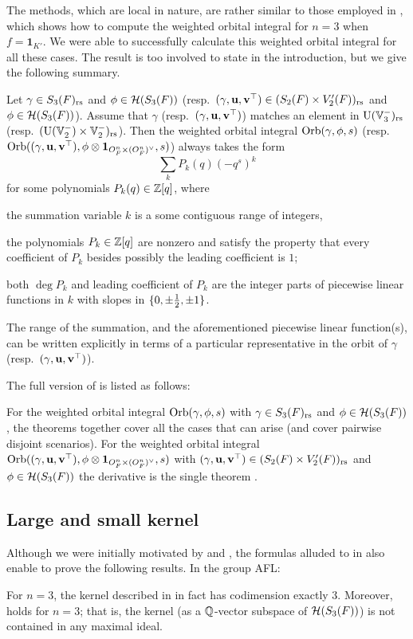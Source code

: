 The methods, which are local in nature,
are rather similar to those employed in \cite{ref:AFL},
which shows how to compute the weighted orbital integral for $n = 3$ when $f = \mathbf{1}_{K'}$.
We were able to successfully calculate this weighted orbital integral for all these cases.
The result is too involved to state in the introduction,
but we give the following summary.
\begin{theorem}
  \label{thm:summary}
  Let $\gamma \in S_3(F)_{\mathrm{rs}}$ and $\phi \in \mathcal H(S_3(F))$
  (resp.\ ${(\gamma, \mathbf u, \mathbf v^\top)} \in (S_2(F) \times V'_2(F))_{\mathrm{rs}}$ and $\phi \in \mathcal H(S_3(F))$).
  Assume that $\gamma$ (resp.\ ${(\gamma, \mathbf u, \mathbf v^\top)}$)
  matches an element in $\operatorname{U}(\mathbb V_3^-)_{\mathrm{rs}}$ (resp.\ $(\operatorname{U}(\mathbb V_2^-) \times \mathbb V_2^-)_{\mathrm{rs}}$).
  Then the weighted orbital integral $\operatorname{Orb}(\gamma, \phi, s)$
  (resp.\ $\operatorname{Orb}({(\gamma, \mathbf u, \mathbf v^\top)}, \phi \otimes \mathbf{1}_{O_F^n \times (O_F^n)^\vee}, s)$) always takes the form
  \[ \sum_k P_k(q) (-q^s)^k \]
  for some polynomials $P_k(q) \in \mathbb Z[q]$, where
  \begin{itemize}
    \ii the summation variable $k$ is a some contiguous range of integers,

    \ii the polynomials $P_k \in \mathbb Z[q]$ are nonzero and satisfy the property
    that every coefficient of $P_k$ besides possibly the leading coefficient is $1$;

    \ii both $\deg P_k$ and leading coefficient of $P_k$ are the integer parts
    of piecewise linear functions in $k$ with slopes in $\{0, \pm\frac{1}{2}, \pm 1\}$.
  \end{itemize}
  The range of the summation, and the aforementioned piecewise linear function(s),
  can be written explicitly in terms of a particular representative
  in the orbit of $\gamma$ (resp.\ ${(\gamma, \mathbf u, \mathbf v^\top)}$).
\end{theorem}
The full version of  is listed as follows:
\begin{itemize}
\ii For the weighted orbital integral $\operatorname{Orb}(\gamma, \phi, s)$
with $\gamma \in S_3(F)_{\mathrm{rs}}$ and $\phi \in \mathcal H(S_3(F))$,
the theorems 
together cover all the cases that can arise (and cover pairwise disjoint scenarios).
\ii For the weighted orbital integral $\operatorname{Orb}({(\gamma, \mathbf u, \mathbf v^\top)}, \phi \otimes \mathbf{1}_{O_F^n \times (O_F^n)^\vee}, s)$
with ${(\gamma, \mathbf u, \mathbf v^\top)} \in (S_2(F) \times V'_2(F))_{\mathrm{rs}}$ and $\phi \in \mathcal H(S_3(F))$
the derivative is the single theorem .
\end{itemize}

\subsection{Large and small kernel}
Although we were initially motivated by
 and ,
the formulas alluded to in  also enable to prove the following results.
In the group AFL:
\begin{theorem}
  \label{thm:large_kernel_group}
  For $n = 3$, the kernel described in 
  in fact has codimension exactly $3$.
  Moreover,  holds for $n = 3$;
  that is, the kernel (as a $\mathbb Q$-vector subspace of $\mathcal H(S_3(F))$)
  is not contained in any maximal ideal.
\end{theorem}


